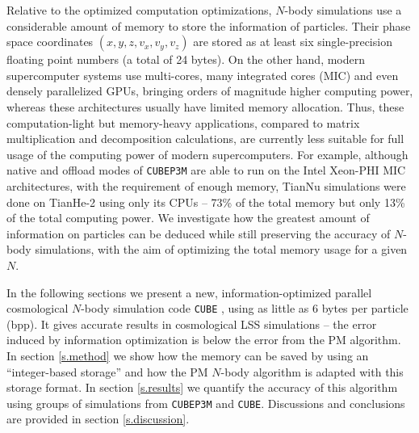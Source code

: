 \documentclass[10pt,twocolumn,reprint]{emulateapj}
\begin{document}
Relative to the optimized computation optimizations, $N$-body simulations use a considerable amount of memory to store the information of particles. Their phase space coordinates $(x,y,z,v_x,v_y,v_z)$ are stored as at least six single-precision floating point numbers (a total of 24 bytes). On the other hand, modern supercomputer systems use multi-cores, many integrated cores (MIC) and even densely parallelized GPUs, bringing orders of magnitude higher computing power, whereas these architectures usually have limited memory allocation. Thus, these computation-light but memory-heavy applications, compared to matrix multiplication and decomposition calculations, are currently less suitable for full usage of the computing power of modern supercomputers. For example, although native and offload modes of {\tt CUBEP3M} are able to run on the Intel Xeon-PHI MIC architectures, with the requirement of enough memory, TianNu simulations were done on TianHe-2 using only its CPUs -- 73\% of the total memory but only 13\% of the total computing power. We investigate how the greatest amount of information on particles can be deduced while still preserving the accuracy of $N$-body simulations, with the aim of optimizing the total memory usage for a given $N$.

In the following sections we present a new, information-optimized parallel cosmological $N$-body simulation code {\tt CUBE} \citep{2018ascl.soft05018Y}, using as little as 6 bytes per particle (bpp). It gives accurate results in cosmological LSS simulations -- the error induced by information optimization is below the error from the PM algorithm. In section \ref{s.method} we show how the memory can be saved by using an ``integer-based storage'' and how the PM $N$-body algorithm is adapted with this storage format. In section \ref{s.results} we quantify the accuracy of this algorithm using groups of simulations from {\tt CUBEP3M} and {\tt CUBE}. Discussions and conclusions are provided in section \ref{s.discussion}.
\end{document}
